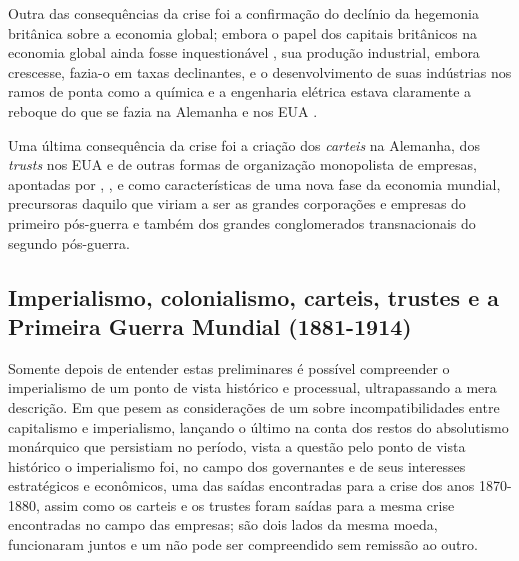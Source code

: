 Outra das consequências da crise foi a confirmação do declínio da hegemonia britânica sobre a economia global; embora o papel dos capitais britânicos na economia global ainda fosse inquestionável \cite{goetzmann_british_2006,rippy_britlat_1954,stone_british_1977}, sua produção industrial, embora crescesse, fazia-o em taxas declinantes, e o desenvolvimento de suas indústrias nos ramos de ponta como a química e a engenharia elétrica estava claramente a reboque do que se fazia na Alemanha e nos EUA \cite[p.~207]{Musson1959}. 

Uma última consequência da crise foi a criação dos \textit{carteis} na Alemanha, dos \textit{trusts} nos EUA e de outras formas de organização monopolista de empresas, apontadas por , , e  como características de uma nova fase da economia mundial, precursoras daquilo que viriam a ser as grandes corporações e empresas do primeiro pós-guerra e também dos grandes conglomerados transnacionais do segundo pós-guerra.

\subsection{Imperialismo, colonialismo, carteis, trustes e a Primeira Guerra Mundial (1881-1914)} \label{sec:impercol}

Somente depois de entender estas preliminares é possível compreender o imperialismo de um ponto de vista histórico e processual, ultrapassando a mera descrição. Em que pesem as considerações de um  sobre incompatibilidades entre capitalismo e imperialismo, lançando o último na conta dos restos do absolutismo monárquico que persistiam no período, vista a questão pelo ponto de vista histórico o imperialismo foi, no campo dos governantes e de seus interesses estratégicos e econômicos, uma das saídas encontradas para a crise dos anos 1870-1880, assim como os carteis e os trustes foram saídas para a mesma crise encontradas no campo das empresas; são dois lados da mesma moeda, funcionaram juntos e um não pode ser compreendido sem remissão ao outro.

